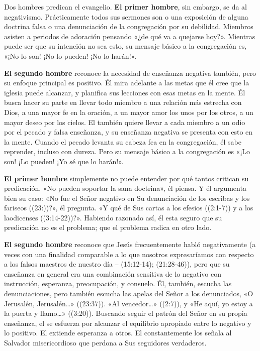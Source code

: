 \documentclass[12pt, twoside, openright]{book}
\begin{document}
Dos hombres predican el evangelio. \textbf{El primer hombre}, sin embargo, se da al negativismo. Prácticamente todos sus sermones son o una exposición de alguna doctrina falsa o una denunciación de la congregación por su debilidad. Miembros asisten a periodos de adoración pensando «¿de qué va a quejarse hoy?». Mientras puede ser que su intención no sea esto, su mensaje básico a la congregación es, «¡No lo son! ¡No lo pueden! ¡No lo harán!».

\textbf{El segundo hombre} reconoce la necesidad de enseñanza negativa también, pero su enfoque principal es positivo. Él mira adelante a las metas que él cree que la iglesia puede alcanzar, y planifica sus lecciones con esas metas en la mente. Él busca hacer su parte en llevar todo miembro a una relación más estrecha con Dios, a una mayor fe en la oración, a un mayor amor los unos por los otros, a un mayor deseo por los cielos. El también quiere llevar a cada miembro a un odio por el pecado y falsa enseñanza, y su enseñanza negativa se presenta con esto en la mente. Cuando el pecado levanta su cabeza fea en la congregación, él sabe reprender, incluso con dureza. Pero su mensaje básico a la congregación es «¡Lo son! ¡Lo pueden! ¡Yo sé que lo harán!».

\textbf{El primer hombre} simplemente no puede entender por qué tantos critican su predicación. «No pueden soportar la sana doctrina», él piensa. Y él argumenta bien su caso: «No fue el Señor negativo en Su denunciación de los escribas y los fariseos ((23:))?», él pregunta. «Y qué de Sus cartas a los efesios ((2:1-7)) y a los laodicenses ((3:14-22))?». Habiendo razonado así, él esta seguro que su predicación no es el problema; que el problema radica en otro lado. 

\textbf{El segundo hombre} reconoce que Jesús frecuentemente habló negativamente (a veces con una finalidad comparable a lo que nosotros expresaríamos con respecto a los falsos maestros de nuestro día – (15:12-14); (21:28-46)), pero que su enseñanza en general era una combinación sensitiva de lo negativo con instrucción, esperanza, preocupación, y consuelo. Él, también, escucha las denunciaciones, pero también escucha las apelas del Señor a los denunciados, «O Jerusalén, Jerusalén…» ((23:37)). «Al vencedor…» ((2:7)), y «He aquí, yo estoy a la puerta y llamo…» ((3:20)). Buscando seguir el patrón del Señor en su propia enseñanza, el se esfuerza por alcanzar el equilibrio apropiado entre lo negativo y lo positivo. El extiende esperanza a otros. El constantemente los señala al Salvador misericordioso que perdona a Sus seguidores verdaderos.
\end{document}
